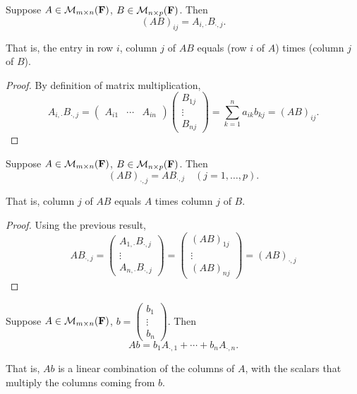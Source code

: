 \begin{lemma}
Suppose $A\in\mathcal{M}_{m\times n}(\mathbf F)$, $B\in\mathcal{M}_{n\times p}(\mathbf F)$. Then
\[(AB)_{ij}=A_{i,\cdot}B_{\cdot,j}.\]
\end{lemma}

That is, the entry in row $i$, column $j$ of $AB$ equals (row $i$ of $A$) times (column $j$ of $B$).

\begin{proof}
By definition of matrix multiplication,
\[A_{i,\cdot}B_{\cdot,j}
=\begin{pmatrix}
A_{i1}&\cdots&A_{in}
\end{pmatrix}
\begin{pmatrix}
B_{1j}\\\vdots\\B_{nj}
\end{pmatrix}
=\sum_{k=1}^{n}a_{ik}b_{kj}
=(AB)_{ij}.\]
\end{proof}

\begin{lemma}
Suppose $A\in\mathcal{M}_{m\times n}(\mathbf F)$, $B\in\mathcal{M}_{n\times p}(\mathbf F)$. Then
\[(AB)_{\cdot,j}=AB_{\cdot,j}\quad(j=1,\dots,p).\]
\end{lemma}

That is, column $j$ of $AB$ equals $A$ times column $j$ of $B$.

\begin{proof}
Using the previous result,
\[AB_{\cdot,j}=\begin{pmatrix}
A_{1,\cdot}B_{\cdot,j}\\
\vdots\\
A_{n,\cdot}B_{\cdot,j}
\end{pmatrix}=\begin{pmatrix}
(AB)_{1j}\\\vdots\\(AB)_{nj}
\end{pmatrix}=(AB)_{\cdot,j}\]
\end{proof}

\begin{lemma}
Suppose $A\in\mathcal{M}_{m\times n}(\mathbf F)$, $b=\begin{pmatrix}
b_1\\\vdots\\b_n
\end{pmatrix}$. Then
\[Ab=b_1A_{\cdot,1}+\cdots+b_nA_{\cdot,n}.\]
\end{lemma}

That is, $Ab$ is a linear combination of the columns of $A$, with the scalars that multiply the columns coming from $b$.

